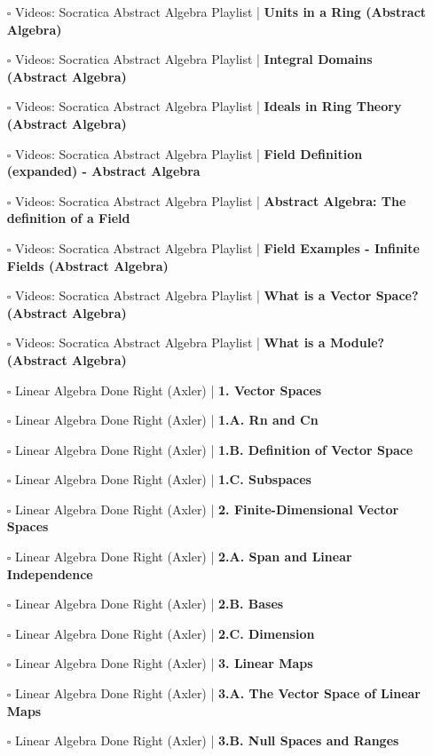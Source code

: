\documentclass[a4, landscape, 12pt]{article}
\newcommand{\checkbox}{$\square$}%
\begin{document}
\begin{itemize}
{}
\item [\checkbox] Videos: Socratica Abstract Algebra Playlist  | \textbf{Units in a Ring (Abstract Algebra)
}
\item [\checkbox] Videos: Socratica Abstract Algebra Playlist  | \textbf{Integral Domains (Abstract Algebra)
}
\item [\checkbox] Videos: Socratica Abstract Algebra Playlist  | \textbf{Ideals in Ring Theory (Abstract Algebra)
}
\item [\checkbox] Videos: Socratica Abstract Algebra Playlist  | \textbf{Field Definition (expanded) - Abstract Algebra
}
\item [\checkbox] Videos: Socratica Abstract Algebra Playlist  | \textbf{Abstract Algebra: The definition of a Field
}
\item [\checkbox] Videos: Socratica Abstract Algebra Playlist  | \textbf{Field Examples - Infinite Fields (Abstract Algebra)
}
\item [\checkbox] Videos: Socratica Abstract Algebra Playlist  | \textbf{What is a Vector Space? (Abstract Algebra)
}
\item [\checkbox] Videos: Socratica Abstract Algebra Playlist  | \textbf{What is a Module? (Abstract Algebra)
}
\item [\checkbox] Linear Algebra Done Right (Axler)  | \textbf{1. Vector Spaces
}
\item [\checkbox] Linear Algebra Done Right (Axler)  | \textbf{1.A. Rn and Cn
}
\item [\checkbox] Linear Algebra Done Right (Axler)  | \textbf{1.B. Definition of Vector Space
}
\item [\checkbox] Linear Algebra Done Right (Axler)  | \textbf{1.C. Subspaces
}
\item [\checkbox] Linear Algebra Done Right (Axler)  | \textbf{2. Finite-Dimensional Vector Spaces
}
\item [\checkbox] Linear Algebra Done Right (Axler)  | \textbf{2.A. Span and Linear Independence
}
\item [\checkbox] Linear Algebra Done Right (Axler)  | \textbf{2.B. Bases
}
\item [\checkbox] Linear Algebra Done Right (Axler)  | \textbf{2.C. Dimension
}
\item [\checkbox] Linear Algebra Done Right (Axler)  | \textbf{3. Linear Maps
}
\item [\checkbox] Linear Algebra Done Right (Axler)  | \textbf{3.A. The Vector Space of Linear Maps
}
\item [\checkbox] Linear Algebra Done Right (Axler)  | \textbf{3.B. Null Spaces and Ranges
}
\end{itemize}
\end{document}
